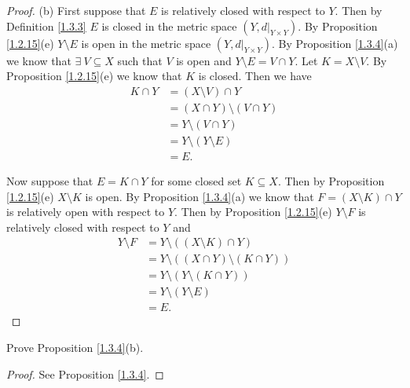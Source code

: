 \begin{proof}{(b)}
    First suppose that \(E\) is relatively closed with respect to \(Y\).
    Then by Definition \ref{1.3.3} \(E\) is closed in the metric space \((Y, d|_{Y \times Y})\).
    By Proposition \ref{1.2.15}(e) \(Y \setminus E\) is open in the metric space \((Y, d|_{Y \times Y})\).
    By Proposition \ref{1.3.4}(a) we know that \(\exists\ V \subseteq X\) such that \(V\) is open and \(Y \setminus E = V \cap Y\).
    Let \(K = X \setminus V\).
    By Proposition \ref{1.2.15}(e) we know that \(K\) is closed.
    Then we have
    \begin{align*}
        K \cap Y & = (X \setminus V) \cap Y          \\
                 & = (X \cap Y) \setminus (V \cap Y) \\
                 & = Y \setminus (V \cap Y)          \\
                 & = Y \setminus (Y \setminus E)     \\
                 & = E.
    \end{align*}

    Now suppose that \(E = K \cap Y\) for some closed set \(K \subseteq X\).
    Then by Proposition \ref{1.2.15}(e) \(X \setminus K\) is open.
    By Proposition \ref{1.3.4}(a) we know that \(F = (X \setminus K) \cap Y\) is relatively open with respect to \(Y\).
    Then by Proposition \ref{1.2.15}(e) \(Y \setminus F\) is relatively closed with respect to \(Y\) and
    \begin{align*}
        Y \setminus F & = Y \setminus ((X \setminus K) \cap Y)          \\
                      & = Y \setminus ((X \cap Y) \setminus (K \cap Y)) \\
                      & = Y \setminus (Y \setminus (K \cap Y))          \\
                      & = Y \setminus (Y \setminus E)                   \\
                      & = E.
    \end{align*}
\end{proof}

\exercisesection

\begin{exercise}\label{ex 1.3.1}
    Prove Proposition \ref{1.3.4}(b).
\end{exercise}

\begin{proof}
    See Proposition \ref{1.3.4}.
\end{proof}